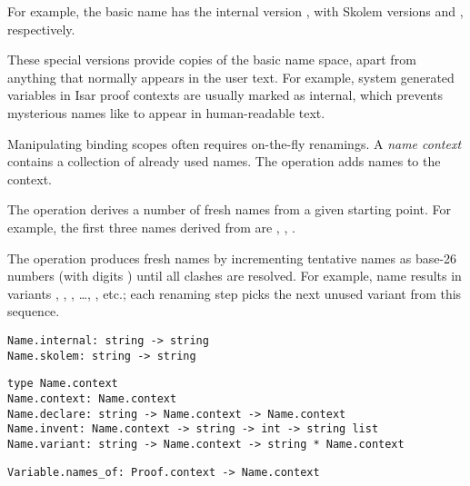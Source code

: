 \begin{isabellebody}
\begin{isamarkuptext}
  For example, the basic name  has the internal version
  , with Skolem versions  and , respectively.

  These special versions provide copies of the basic name space, apart
  from anything that normally appears in the user text.  For example,
  system generated variables in Isar proof contexts are usually marked
  as internal, which prevents mysterious names like  to
  appear in human-readable text.

  \medskip Manipulating binding scopes often requires on-the-fly
  renamings.  A \emph{name context} contains a collection of already
  used names.  The  operation adds names to the
  context.

  The  operation derives a number of fresh names from
  a given starting point.  For example, the first three names derived
  from  are , , .

  The  operation produces fresh names by
  incrementing tentative names as base-26 numbers (with digits ) until all clashes are resolved.  For example, name  results in variants , , , \dots, ,  etc.; each renaming
  step picks the next unused variant from this sequence.%
\end{isamarkuptext}%
\isamarkuptrue%
%
\isadelimmlref
%
\endisadelimmlref
%
\isatagmlref
%
\begin{isamarkuptext}%
\begin{mldecls}
  \verb|Name.internal: string -> string| \\
  \verb|Name.skolem: string -> string| \\
  \end{mldecls}
  \begin{mldecls}
  \verb|type Name.context| \\
  \verb|Name.context: Name.context| \\
  \verb|Name.declare: string -> Name.context -> Name.context| \\
  \verb|Name.invent: Name.context -> string -> int -> string list| \\
  \verb|Name.variant: string -> Name.context -> string * Name.context| \\
  \end{mldecls}
  \begin{mldecls}
  \verb|Variable.names_of: Proof.context -> Name.context| \\
  \end{mldecls}


\end{isamarkuptext}
\end{isabellebody}
